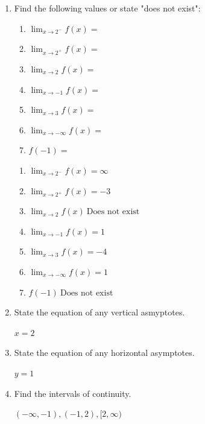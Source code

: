 \documentclass[nooutcomes,handout]{ximera}
\begin{document}
\begin{problem}
\begin{enumerate}
		\item Find the following values or state "does not exist":
			\begin{enumerate}
 			\item $\lim_{x \to 2^-} f(x)=$
			\item $\lim_{x \to 2^+} f(x)=$
			\item $\lim_{x \to 2} f(x)=$
			\item $\lim_{x \to -1} f(x)=$
			\item $\lim_{x \to 3} f(x)=$
			\item $\lim_{x \to -\infty} f(x)=$
			\item $f(-1)=$
			\end{enumerate}
		\begin{freeResponse}
			\begin{enumerate}
 			\item $\lim_{x \to 2^-} f(x)=\infty$
			\item $\lim_{x \to 2^+} f(x)=-3$
			\item $\lim_{x \to 2} f(x)\ \text{Does not exist}$
			\item $\lim_{x \to -1} f(x)=1$
			\item $\lim_{x \to 3} f(x)=-4$
			\item $\lim_{x \to -\infty} f(x)=1$
			\item $f(-1)\  \text{Does not exist}$
			\end{enumerate}
		\end{freeResponse}


		\item State the equation of any vertical asmyptotes.
			\begin{freeResponse}
			$x=2$
			\end{freeResponse}


		\item State the equation of any horizontal asymptotes.
			\begin{freeResponse}
			$y=1$
			\end{freeResponse}
	
		\item Find the intervals of continuity.
			\begin{freeResponse}
			$(-\infty,-1),(-1,2),[2,\infty)$
			\end{freeResponse}
	
	\end{enumerate}
\end{problem}
\end{document}
